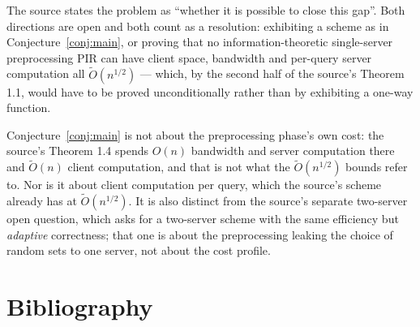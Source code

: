 \documentclass{conjura-conjecture}
\newcommand{\Ot}{\widetilde{O}}
\begin{document}
\begin{remark}
The source states the problem as ``whether it is possible to close this
gap''. Both directions are open and both count as a resolution:
exhibiting a scheme as in Conjecture~\ref{conj:main}, or proving that no
information-theoretic single-server preprocessing PIR can have client
space, bandwidth and per-query server computation all $\Ot(n^{1/2})$ ---
which, by the second half of the source's Theorem 1.1, would have to be
proved unconditionally rather than by exhibiting a one-way function.
\end{remark}

\begin{remark}
Conjecture~\ref{conj:main} is not about the preprocessing phase's own
cost: the source's Theorem 1.4 spends $O(n)$ bandwidth and server
computation there and $\Ot(n)$ client computation, and that is not what
the $\Ot(n^{1/2})$ bounds refer to. Nor is it about client computation
per query, which the source's scheme already has at $\Ot(n^{1/2})$. It
is also distinct from the source's separate two-server open question,
which asks for a two-server scheme with the same efficiency but
\emph{adaptive} correctness; that one is about the preprocessing leaking
the choice of random sets to one server, not about the cost profile.
\end{remark}

\section{Bibliography}
\end{document}
